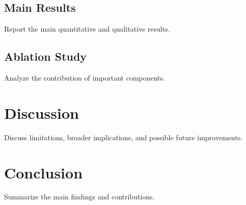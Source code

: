 \documentclass[lettersize,journal]{IEEEtran}
\begin{document}
\subsection{Main Results}
\label{sec:main_results}
Report the main quantitative and qualitative results.

\subsection{Ablation Study}
\label{sec:ablation_study}
Analyze the contribution of important components.

\section{Discussion}
\label{sec:discussion}
Discuss limitations, broader implications, and possible future improvements.

\section{Conclusion}
\label{sec:conclusion}
Summarize the main findings and contributions.



\end{document}
